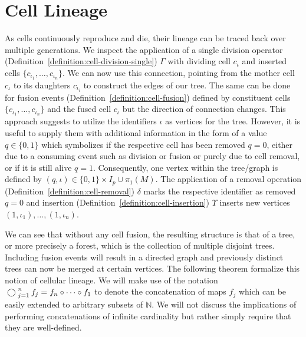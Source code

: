 \section{Cell Lineage}
\label{section:cell-lineage}
As cells continuously reproduce and die, their lineage can be traced back over multiple generations.
We inspect the application of a single division operator
(Definition~\ref{definition:cell-division-single}) $\Gamma$ with dividing cell $c_\iota$ and
inserted cells $\{c_{\iota_1},\dots,c_{\iota_n}\}$.
We can now use this connection, pointing from the mother cell $c_\iota$ to its daughters
$c_{\iota_i}$ to construct the edges of our tree.
The same can be done for fusion events (Definition~\ref{definition:cell-fusion}) defined by
constituent cells $\{c_{\iota_1},\dots,c_{\iota_n}\}$ and the fused cell $c_\iota$ but the direction
of connection changes.
This approach suggests to utilize the identifiers $\iota$ as vertices for the tree.
However, it is useful to supply them with additional information in the form of a value
$q\in\{0,1\}$ which symbolizes if the respective cell has been removed $q=0$, either due to a
consuming event such as division or fusion or purely due to cell removal, or if it is still alive
$q=1$.
Consequently, one vertex within the tree/graph is defined by
$(q,\iota)\in\{0,1\}\times I_p\cup\pi_1(M)$.
The application of a removal operation (Definition~\ref{definition:cell-removal}) $\delta$ marks the
respective identifier as removed $q=0$ and insertion
(Definition~\ref{definition:cell-insertion}) $\Upsilon$ inserts new vertices
$(1,\iota_1),\dots,(1,\iota_n)$.

We can see that without any cell fusion, the resulting structure is that of a tree, or more
precisely a forest, which is the collection of multiple disjoint trees.
Including fusion events will result in a directed graph and previously distinct trees can now be
merged at certain vertices.
The following theorem formalize this notion of cellular lineage.
We will make use of the notation $\bigcomp_{j=1}^nf_j=f_n\circ\dots\circ f_1$ to denote the
concatenation of maps $f_j$ which can be easily extended to arbitrary subsets of $\mathbb{N}$.
We will not discuss the implications of performing concatenations of infinite cardinality but rather
simply require that they are well-defined.

